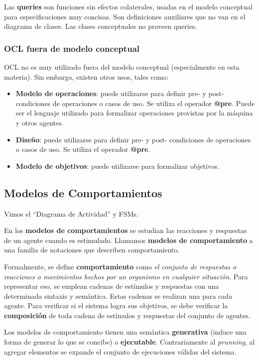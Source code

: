 \documentclass[]{article}
\begin{document}
Las \textbf{queries} son funciones sin efectos colaterales, usadas en el modelo conceptual para especificaciones muy concisas. Son definiciones auxiliares que no van en el diagrama de clases. Las clases conceptuales no proveen queries.

\subsubsection{OCL fuera de modelo conceptual}
OCL no es muy utilizado fuera del modelo conceptual (especialmente en esta materia). Sin embargo, existen otros usos, tales como:
\begin{itemize}
	\item \textbf{Modelo de operaciones}: puede utilizarse para definir pre- y post- condiciones de operaciones o casos de uso. Se utiliza el operador \textbf{@pre}. Puede ser el lenguaje utilizado para formalizar operaciones provistas por la máquina y otros agentes.
	\item \textbf{Diseño}: puede utilizarse para definir pre- y post- condiciones de operaciones o casos de uso. Se utiliza el operador \textbf{@pre}.
	\item \textbf{Modelo de objetivos}: puede utilizarse para formalizar objetivos.
\end{itemize}

\subsection{Modelos de Comportamientos}
Vimos el ``Diagrama de Actividad'' y FSMs.

En los \textbf{modelos de comportamientos} se estudian las reacciones y respuestas de un agente cuando es estimulado. Llamamos \textbf{modelos de comportamiento} a una familia de notaciones que describen comportamiento.

Formalmente, se define \textbf{comportamiento} como \textit{el conjunto de respuestas o reacciones o movimientos hechos por un organismo en cualquier situación}. Para representar eso, se emplean cadenas de estímulos y respuestas con una determinada sintaxis y semántica. Estas cadenas se realizan una para cada agente. Para verificar si el sistema logra sus objetivos, se debe verificar la \textbf{composición} de toda cadena de estímulos y respuestas del conjunto de agentes.

Los modelos de comportamiento tienen una semántica \textbf{generativa} (induce una forma de generar lo que se concibe) o \textbf{ejecutable}. Contrariamente al \textit{prunning}, al agregar elementos se expande el conjunto de ejecuciones válidas del sistema.
\end{document}
